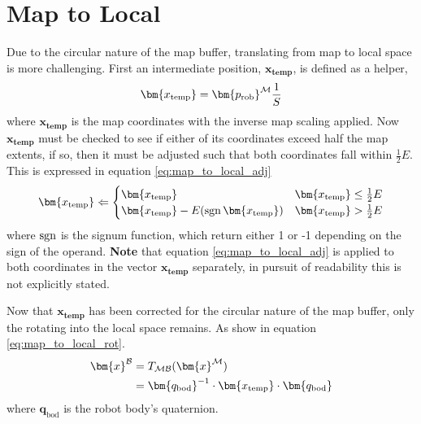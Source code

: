    \section{Map to Local}
        Due to the circular nature of the map buffer, translating from map to local space is more challenging. First an intermediate position, \(\bm{x_\text{temp}}\), is defined as a helper,
        \begin{equation} \label{eq:map_to_local_help}
            \bm{x_\text{temp}} = \bm{p_\text{rob}}\inrefframe{\fmap}\frac{1}{S}
        \end{equation}
        where \(\bm{x_\text{temp}}\) is the map coordinates with the inverse map scaling applied. Now \(\bm{x_\text{temp}}\) must be checked to see if either of its 
        coordinates exceed half the map extents, if so, then it must be adjusted such that both coordinates fall within \(\frac{1}{2}E\).
        This is expressed in equation \ref{eq:map_to_local_adj}
        \begin{equation} \label{eq:map_to_local_adj}
            \bm{x_\text{temp}} \Leftarrow 
            \begin{cases}
                \bm{x_\text{temp}} & \bm{x_\text{temp}} \leq \frac{1}{2}E \\
                \bm{x_\text{temp}} - E(\sgn \bm{x_\text{temp}}) & \bm{x_\text{temp}} > \frac{1}{2}E
            \end{cases}
        \end{equation}
        where \(\operatorname{sgn}\) is the signum function, which return either 1 or -1 depending on the sign of the operand. 
        \textbf{Note} that equation \ref{eq:map_to_local_adj} is applied to both coordinates in the vector \(\bm{x_\text{temp}}\) separately, in pursuit of readability this is not explicitly stated.

        Now that \(\bm{x_\text{temp}}\) has been corrected for the circular nature of the map buffer, only the rotating into the local space remains. As show in equation \ref{eq:map_to_local_rot}.
        \begin{align} \label{eq:map_to_local_rot}
        \begin{split}
            \bm{x}\inrefframe{\fbody} &= \transframe{\bm{x}\inrefframe{\fmap}}{\fmap}{\fbody} \\
            &= \bm{q_\text{bod}}^{-1} \cdot \bm{x_\text{temp}} \cdot \bm{q_\text{bod}}
        \end{split}
        \end{align}
        where \(\bm{q}_\text{bod}\) is the robot body's quaternion.
    
